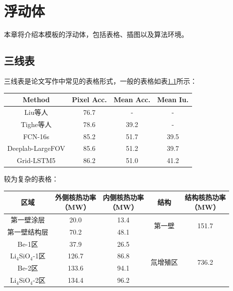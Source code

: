 \chapter{浮动体}
\label{cha:float}
本章将介绍本模板的浮动体，包括表格、插图以及算法环境。
\section{三线表}
\label{sec:sheet}
三线表是论文写作中常见的表格形式，一般的表格如表\ref{tab:siftflow}所示：
\begin{table}[h] 
	\renewcommand\arraystretch{1.5}
	\centering
		\begin{tabular}{*{4}{c}}
			\toprule
	 		Method & Pixel Acc. & Mean Acc. & Mean Iu.\\
			\midrule
			Liu等人\cite{liu2011sift}  & 76.7 & - & -\\
			Tighe等人\cite{tighe2013finding}  & 78.6 & 39.2 & -\\
			FCN-16s\cite{long2015fully} & 85.2 & 51.7 & 39.5\\
			Deeplab-LargeFOV\cite{chen14semantic} & 85.6 & 51.2 & 39.7\\
			\midrule
			Grid-LSTM5 & 86.2 & 51.0 & 41.2\\
			\bottomrule
		\end{tabular}	
		\label{tab:siftflow}
\end{table}

较为复杂的表格：
\begin{table}[h]
	\renewcommand\arraystretch{1.5}
	\centering
	\begin{tabular}{*{5}{c}}
		\toprule
		区域 & \tabincell{c}{外侧核热功率\\（MW）} & \tabincell{c}{内侧核热功率\\（MW）} & 结构 & \tabincell{c}{结构核热功率\\（MW）} \\
		\midrule
		第一壁涂层 & 20.0 & 13.4 & \multirow{2}{*}{第一壁} & \multirow{2}{*}{151.7} \\
		第一壁结构层 & 70.2 & 48.1 & ~ & ~ \\
		\midrule
		Be-1区 & 37.9 & 26.5 & \multirow{4}{*}{氚增殖区} & \multirow{4}{*}{736.2} \\ 
		Li$ _{\text{4}} $SiO$ _{\text{4}} $-1区 & 126.7 & 86.8 & ~ & ~ \\
		Be-2区 & 133.6 & 94.1 & ~ & ~ \\
		Li$ _{\text{4}} $SiO$ _{\text{4}} $-2区 & 134.4 & 96.2 & ~ & ~ \\
		\bottomrule
	\end{tabular}
	\label{tab:nucheat_tot}
\end{table}

